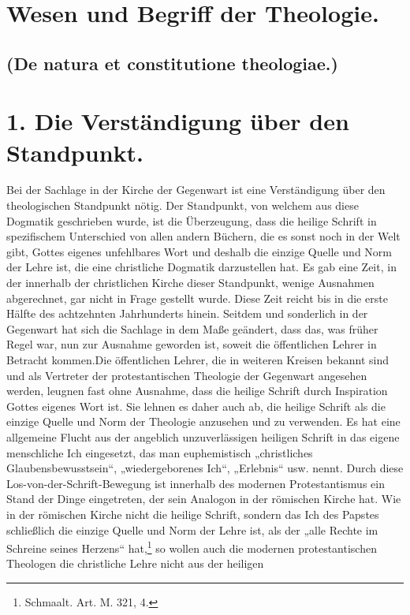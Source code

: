 \section*{Wesen und Begriff der Theologie.}\subsection*{(De natura et constitutione theologiae.)}\section*{1. Die Verständigung über den Standpunkt.}Bei der Sachlage in der Kirche der Gegenwart ist eine Verständigung über den theologischen Standpunkt nötig. Der Standpunkt, von welchem aus diese Dogmatik geschrieben wurde, ist die Überzeugung, dass die heilige Schrift in spezifischem Unterschied von allen andern Büchern, die es sonst noch in der Welt gibt, Gottes eigenes unfehlbares Wort und deshalb die einzige Quelle und Norm der Lehre ist, die eine christliche Dogmatik darzustellen hat. Es gab eine Zeit, in der innerhalb der christlichen Kirche dieser Standpunkt, wenige Ausnahmen abgerechnet, gar nicht in Frage gestellt wurde. Diese Zeit reicht bis in die erste Hälfte des achtzehnten Jahrhunderts hinein. Seitdem und sonderlich in der Gegenwart hat sich die Sachlage in dem Maße geändert, dass das, was früher Regel war, nun zur Ausnahme geworden ist, soweit die öffentlichen Lehrer in Betracht kommen.Die öffentlichen Lehrer, die in weiteren Kreisen bekannt sind und als Vertreter der protestantischen Theologie der Gegenwart angesehen werden, leugnen fast ohne Ausnahme, dass die heilige Schrift durch Inspiration Gottes eigenes Wort ist. Sie lehnen es daher auch ab, die heilige Schrift als die einzige Quelle und Norm der Theologie anzusehen und zu verwenden. Es hat eine allgemeine Flucht aus der angeblich unzuverlässigen heiligen Schrift in das eigene menschliche Ich eingesetzt, das man euphemistisch „christliches Glaubensbewusstsein“, „wiedergeborenes Ich“, „Erlebnis“ usw. nennt. Durch diese Los-von-der-Schrift-Bewegung ist innerhalb des modernen Protestantismus ein Stand der Dinge eingetreten, der sein Analogon in der römischen Kirche hat. Wie in der römischen Kirche nicht die heilige Schrift, sondern das Ich des Papstes schließlich die einzige Quelle und Norm der Lehre ist, als der „alle Rechte im Schreine seines Herzens“ hat,\footnote{Schmaalt. Art. M. 321, 4.} so wollen auch die modernen protestantischen Theologen die christliche Lehre nicht aus der heiligen